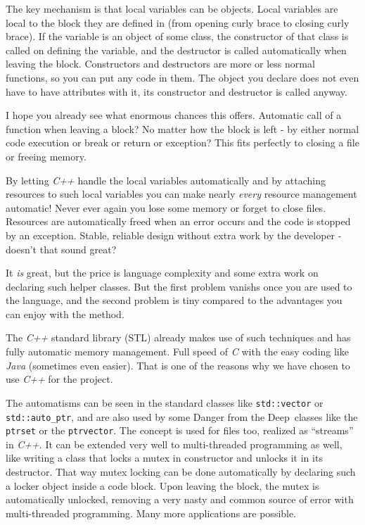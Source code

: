 \documentclass[english,a4paper,12pt]{report}
\newcommand{\dftd}{\textsf{Danger from the Deep}}
\begin{document}
The key mechanism is that local variables can be objects. Local
variables are local to the block they are defined in (from opening curly
brace to closing curly brace). If the variable is an object of some
class, the constructor of that class is called on defining the variable,
and the destructor is called automatically when leaving the block.
Constructors and destructors are more or less normal functions, so you
can put any code in them. The object you declare does not even have to
have attributes with it, its constructor and destructor is called
anyway.

I hope you already see what enormous chances this offers. Automatic call
of a function when leaving a block? No matter how the block is left - by
either normal code execution or break or return or exception? This fits
perfectly to closing a file or freeing memory.

By letting \emph{C++} handle the local variables automatically and by
attaching resources to such local variables you can make nearly
\emph{every} resource management automatic! Never ever again you lose
some memory or forget to close files. Resources are automatically freed
when an error occurs and the code is stopped by an exception. Stable,
reliable design without extra work by the developer - doesn't that sound
great?

It \emph{is} great, but the price is language complexity and some extra
work on declaring such helper classes. But the first problem vanishs
once you are used to the language, and the second problem is tiny
compared to the advantages you can enjoy with the method.

The \emph{C++} standard library (STL) already makes use of such
techniques and has fully automatic memory management. Full speed of
\emph{C} with the easy coding like \emph{Java} (sometimes even easier).
That is one of the reasons why we have chosen to use \emph{C++} for the
project.

The automatisms can be seen in the standard classes like
\texttt{std::vector} or \texttt{std::auto\_ptr}, and are also used by
some \dftd\ classes like the \texttt{ptrset} or the \texttt{ptrvector}.
The concept is used for files too, realized as ``streams'' in
\emph{C++}. It can be extended very well to multi-threaded programming
as well, like writing a class that locks a mutex in constructor and
unlocks it in its destructor. That way mutex locking can be done
automatically by declaring such a locker object inside a code block.
Upon leaving the block, the mutex is automatically unlocked, removing a
very nasty and common source of error with multi-threaded programming.
Many more applications are possible.
\end{document}
